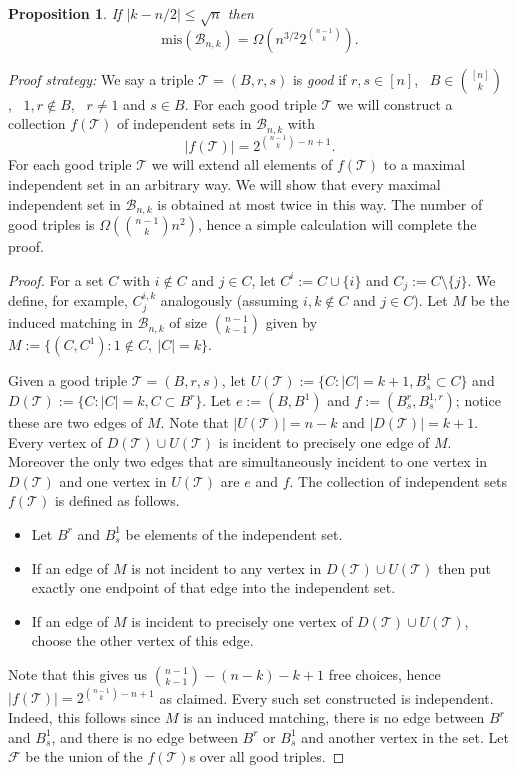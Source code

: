 \documentclass[11pt]{article}
\newtheorem{prop}[theorem]{Proposition}
\numberwithin{equation}{section}
\def\B{\mathcal{B}}
\def\F{\mathcal{F}}
\def\T{\mathcal{T}}
\def\mis{\text{mis}}
\begin{document}
\begin{prop}\label{kahncounterlemma}
If $|k-n/2|\leq\sqrt{n}$ then
$$\mis(\B_{n,k})=\Omega\left(n^{3/2}2^{\binom{n-1}{k}}\right).$$
\end{prop}
\noindent\emph{Proof strategy:}
We say a triple $\T=(B,r,s)$ is \emph{good} if  $r,s \in [n]$,~ $B \in \binom{[n]}{k}$,~ $1,r\notin B$,~ $r\neq 1$ and $s\in B$.
For each good triple $\T$ we will construct a collection $f(\T)$ of independent sets in $\B_{n,k}$ with $$|f(\T)|=2^{\binom{n-1}{k}-n+1}.$$
For each good triple $\T$ we will extend all elements of $f(\T)$ to a maximal independent set in an arbitrary way. We will show that every maximal independent set in $\B_{n,k}$ is obtained at most twice in this way. The number of good triples is $\Omega\left(\binom{n-1}{k}n^2\right)$, hence a simple calculation will complete the proof.
\begin{proof}
For a set $C$ with $i\notin C$ and $j\in C$, let $C^i:=C\cup \{i\}$ and $C_j:=C\setminus \{j\}$. We define, for example, $C^{i,k}_j$ analogously (assuming $i,k\notin C$ and $j\in C$). Let $M$ be the induced matching in $\B_{n,k}$ of size $\binom{n-1}{k-1}$ given by $M:=\{(C,C^1): 1\notin C, ~ |C|=k\}$. %

Given a good triple $\T=(B,r,s)$, let $U(\T):=\{C: |C|=k+1, B^1_s\subset C\}$ and $D(\T):=\{C: |C|=k, C\subset B^r\}$. Let $e:=(B,B^1)$ and $f:=(B^r_s,B^{1,r}_s)$; notice these are two edges of $M$. Note that $|U(\T)|=n-k$ and $|D(\T)|=k+1$. Every vertex of $D(\T)\cup U(\T)$ is incident to precisely one edge of $M$. Moreover the only two edges that are simultaneously incident to one vertex in $D(\T)$ and one vertex in $U(\T)$ are $e$ and $f$. The collection of independent sets $f(\T)$ is defined as follows.
\begin{itemize}
\item Let $B^r$ and $B^1_s$ be elements of the independent set.
\item\label{seconditem} If an edge of $M$ is not incident to any vertex in $D(\T)\cup U(\T)$ then put exactly one endpoint of that edge into the independent set.
\item\label{thirditem} If an edge of $M$ is incident to precisely one vertex of $D(\T)\cup U(\T)$, choose the other vertex of this edge.
\end{itemize}
Note that this gives us $\binom{n-1}{k-1}-(n-k)-k+1$ free choices, hence $|f(\T)|=2^{\binom{n-1}{k}-n+1}$ as claimed. Every such set constructed is independent. Indeed, this follows since $M$ is an induced matching, there is no edge between $B^r$ and $B^1_s$, and there is no edge between $B^r$ or $B^1_s$ and another vertex in the set. Let $\F$ be the union of the $f(\T)$s over all good triples.




\end{proof}
\end{document}
